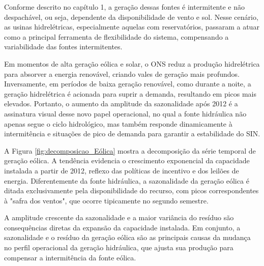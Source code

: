 \begin{figure}[!ht]
  {}
  {}
\end{figure}

Conforme descrito no capítulo 1, a geração dessas fontes é intermitente e não despachável, ou seja, dependente da 
disponibilidade de vento e sol. Nesse cenário, as usinas hidrelétricas, especialmente aquelas com reservatórios, passaram 
a atuar como a principal ferramenta de flexibilidade do sistema, compensando a variabilidade das fontes intermitentes. 

Em momentos de alta geração eólica e solar, o ONS reduz a produção hidrelétrica para absorver a energia renovável, criando vales 
de geração mais profundos. Inversamente, em períodos de baixa geração renovável, como durante a noite, a geração hidrelétrica 
é acionada para suprir a demanda, resultando em picos mais elevados. Portanto, o aumento da amplitude da sazonalidade após 
2012 é a assinatura visual desse novo papel operacional, no qual a fonte hidráulica não apenas segue o ciclo hidrológico, 
mas também responde dinamicamente à intermitência e situações de pico de demanda para garantir a estabilidade do SIN. \cite{Wang2025}

A Figura \ref{fig:decomposicao_Eólica} mostra a decomposição da série temporal de geração eólica. A tendência
evidencia o crescimento exponencial da capacidade instalada a partir de 2012, reflexo das políticas de incentivo e dos leilões 
de energia. Diferentemente da fonte hidráulica, a sazonalidade da geração eólica é ditada exclusivamente 
pela disponibilidade do recurso, com picos correspondentes à "safra dos ventos", que ocorre tipicamente no segundo semestre. 

A amplitude crescente da sazonalidade e a maior variância do resíduo são consequências diretas da expansão 
da capacidade instalada. Em conjunto, a sazonalidade e o resíduo da geração eólica são as principais causas da mudança no 
perfil operacional da geração hidráulica, que ajusta sua produção para compensar a intermitência da fonte eólica.

\begin{figure}[!ht]
  {}
  {}
\end{figure}

